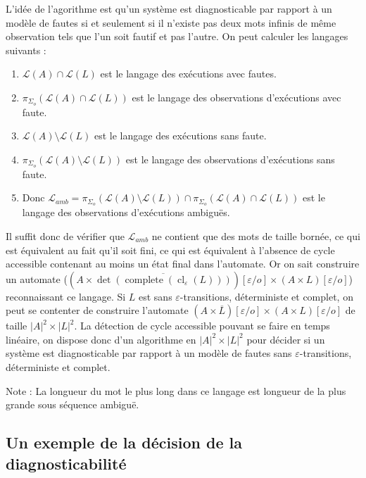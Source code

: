 \documentclass[10pt,a4paper]{article}
\begin{document}
L'id\'ee de l'agorithme est qu'un système est diagnosticable par rapport \`a un mod\`ele de fautes si et seulement si il n'existe pas deux mots infinis de même observation tels que l'un soit fautif et pas l'autre.
On peut calculer les langages suivants :
\begin{enumerate} 
  \item $\mathcal L (A) \cap \mathcal L(L)$ est le langage des ex\'ecutions avec fautes.
  \item $\pi_{\Sigma_o}(\mathcal L (A) \cap \mathcal L(L))$ est le langage des observations d'ex\'ecutions avec faute.
  \item $\mathcal L(A) \setminus \mathcal L(L)$ est le langage des ex\'ecutions sans faute.
  \item $\pi_{\Sigma_o}(\mathcal L(A) \setminus \mathcal L(L))$ est le langage des observations d'ex\'ecutions sans faute.
  \item Donc $ \mathcal L_{amb} = \pi_{\Sigma_o}(\mathcal L(A) \setminus \mathcal L(L)) \cap \pi_{\Sigma_o}(\mathcal L (A) \cap \mathcal L(L))$ est le langage des observations d'ex\'ecutions ambiguës.
\end{enumerate}

Il suffit donc de v\'erifier que $\mathcal L_{amb}$ ne contient que des mots de taille born\'ee, ce qui est équivalent au fait qu'il soit fini, ce qui est \'equivalent \`a l'absence de cycle accessible contenant au moins un \'etat final dans l'automate. Or on sait construire un automate ($(A\times \overline{\det(\operatorname{complete}(\operatorname{cl}_\varepsilon(L)))})[\varepsilon/o] \times (A\times L)[\varepsilon/o]$) reconnaissant ce langage. Si $L$ est sans $\varepsilon$-transitions, d\'eterministe et complet, on peut se contenter de construire l'automate $(A\times \overline{L})[\varepsilon/o] \times (A\times L)[\varepsilon/o]$ de taille $|A|^2 \times |L|^2$. La d\'etection de cycle accessible pouvant se faire en temps lin\'eaire, on dispose donc d'un algorithme en $|A|^2 \times |L|^2$ pour d\'ecider si un syst\`eme est diagnosticable par rapport \`a un mod\`ele de fautes sans $\varepsilon$-transitions, d\'eterministe et complet.

Note : La longueur du mot le plus long dans ce langage est longueur de la plus grande sous séquence ambiguë.
\subsection{Un exemple de la d\'ecision de la diagnosticabilit\'e}
\end{document}
